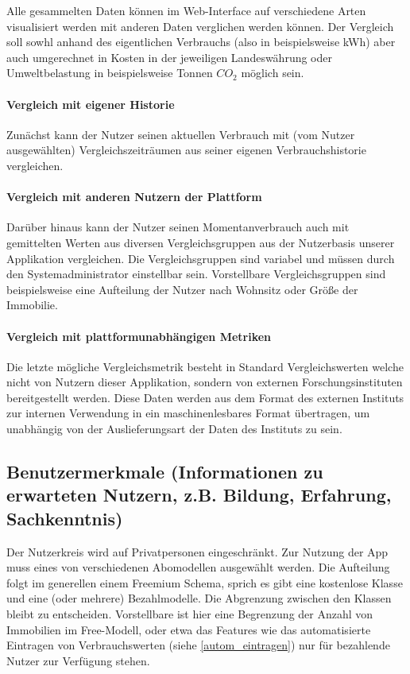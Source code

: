 Alle gesammelten Daten können im Web-Interface auf verschiedene Arten visualisiert werden mit anderen Daten verglichen werden können. Der Vergleich soll sowhl anhand des eigentlichen Verbrauchs (also in beispielsweise kWh) aber auch umgerechnet in Kosten in der jeweiligen Landeswährung oder Umweltbelastung in beispielsweise Tonnen $CO_2$ möglich sein.

\paragraph{Vergleich mit eigener Historie}

Zunächst kann der Nutzer seinen aktuellen Verbrauch  mit (vom Nutzer ausgewählten) Vergleichszeiträumen aus seiner eigenen Verbrauchshistorie vergleichen.


\paragraph{Vergleich mit anderen Nutzern der Plattform}
Darüber hinaus kann der Nutzer seinen Momentanverbrauch auch mit gemittelten Werten aus diversen Vergleichsgruppen aus der Nutzerbasis unserer Applikation vergleichen. Die Vergleichsgruppen sind variabel und müssen durch den Systemadministrator einstellbar sein. Vorstellbare Vergleichsgruppen sind beispielsweise eine Aufteilung der Nutzer nach Wohnsitz oder Größe der Immobilie.


\paragraph{Vergleich mit plattformunabhängigen Metriken}
\label{vgl_plattformunabhängig}

Die letzte mögliche Vergleichsmetrik besteht in Standard Vergleichswerten welche nicht von Nutzern dieser Applikation, sondern von externen Forschungsinstituten bereitgestellt werden. Diese Daten werden aus dem Format des externen Instituts zur internen Verwendung in ein maschinenlesbares Format übertragen, um unabhängig von der Auslieferungsart der Daten des Instituts zu sein.


\subsection{Benutzermerkmale (Informationen zu erwarteten Nutzern, z.B. Bildung, Erfahrung, Sachkenntnis)}

    Der Nutzerkreis wird auf Privatpersonen eingeschränkt. 
    Zur Nutzung der App muss eines von verschiedenen Abomodellen ausgewählt werden.
    Die Aufteilung folgt im generellen einem \glqq{}Freemium\grqq{} Schema, sprich es gibt eine kostenlose Klasse und eine (oder mehrere) Bezahlmodelle. Die Abgrenzung zwischen den Klassen bleibt zu entscheiden. Vorstellbare ist hier eine Begrenzung der Anzahl von Immobilien im Free-Modell, oder etwa das Features wie das automatisierte Eintragen von Verbrauchswerten (siehe \ref{autom_eintragen}) nur für bezahlende Nutzer zur Verfügung stehen.

